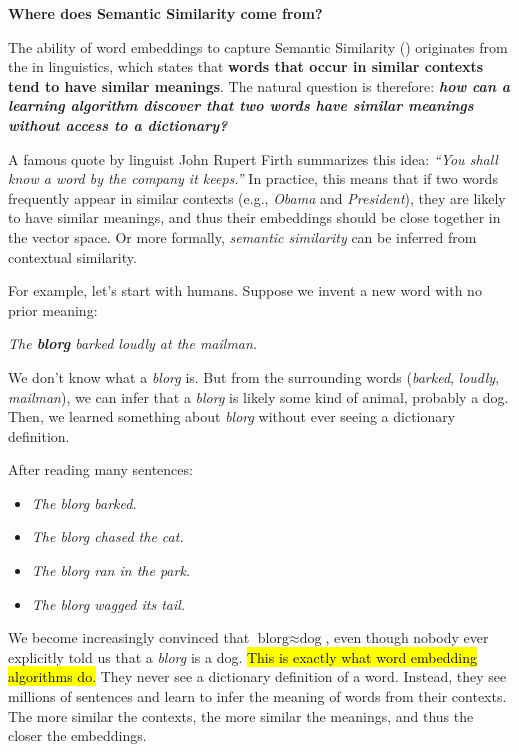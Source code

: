\highspace
\begin{flushleft}
    \textcolor{Green3}{ \textbf{Where does Semantic Similarity come from?}}
\end{flushleft}
The ability of word embeddings to capture Semantic Similarity () originates from the  in linguistics, which states that \textbf{words that occur in similar contexts tend to have similar meanings}. The natural question is therefore: \emph{\textbf{how can a learning algorithm discover that two words have similar meanings without access to a dictionary?}}

\highspace
A famous quote by linguist John Rupert Firth summarizes this idea: \emph{``You shall know a word by the company it keeps.''} In practice, this means that if two words frequently appear in similar contexts (e.g., \emph{Obama} and \emph{President}), they are likely to have similar meanings, and thus their embeddings should be close together in the vector space. Or more formally, \emph{semantic similarity} can be inferred from contextual similarity.

\highspace
For example, let's start with humans. Suppose we invent a new word with no prior meaning:
\begin{center}
    \emph{The \textbf{blorg} barked loudly at the mailman.}
\end{center}
We don't know what a \emph{blorg} is. But from the surrounding words (\emph{barked}, \emph{loudly}, \emph{mailman}), we can infer that a \emph{blorg} is likely some kind of animal, probably a dog. Then, we learned something about \emph{blorg} without ever seeing a dictionary definition.

\highspace
After reading many sentences:
\begin{itemize}
    \item \emph{The blorg barked.}
    \item \emph{The blorg chased the cat.}
    \item \emph{The blorg ran in the park.}
    \item \emph{The blorg wagged its tail.}
\end{itemize}
We become increasingly convinced that $\text{blorg} \approx \text{dog}$, even though nobody ever explicitly told us that a \emph{blorg} is a dog. \hl{This is exactly what word embedding algorithms do.} They never see a dictionary definition of a word. Instead, they see millions of sentences and learn to infer the meaning of words from their contexts. The more similar the contexts, the more similar the meanings, and thus the closer the embeddings.

